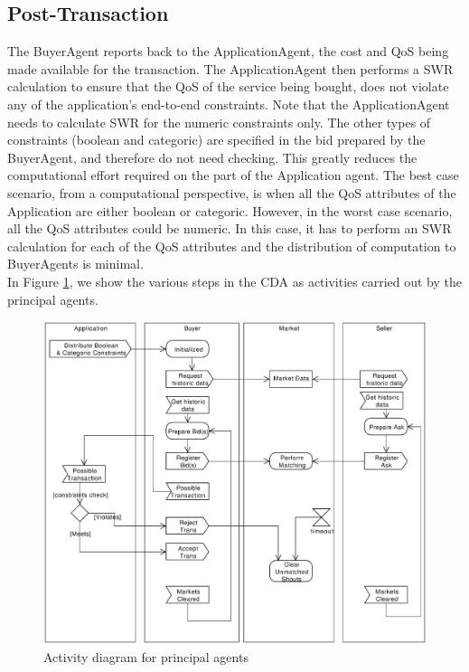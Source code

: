 \documentclass[10pt,journal,compsoc]{IEEEtran}
\begin{document}
\subsection{Post-Transaction}
The BuyerAgent reports back to the ApplicationAgent, the cost and QoS being made available for the transaction. The ApplicationAgent then performs a SWR calculation to ensure that the QoS of the service being bought, does not violate any of the application's end-to-end constraints. Note that the ApplicationAgent needs to calculate SWR for the numeric constraints only. The other types of constraints (boolean and categoric) are specified in the bid prepared by the BuyerAgent, and therefore do not need checking. This greatly reduces the computational effort required on the part of the Application agent. The best case scenario, from a computational perspective, is when all the QoS attributes of the Application are either boolean or categoric. However, in the worst case scenario, all the QoS attributes could be numeric. In this case, it has to perform an SWR calculation for each of the QoS attributes and the distribution of computation to BuyerAgents is minimal.\\

In Figure \ref{fig:cda_activity_diagram}, we show the various steps in the CDA  as activities carried out by the principal agents.
 
 \begin{figure}[h]
	\centering
	\includegraphics[scale=0.30]{Figure2.eps}
	\caption{Activity diagram for principal agents}
	\label{fig:cda_activity_diagram}
\end{figure}	
\end{document}
